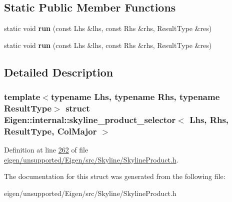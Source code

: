 \subsection*{Static Public Member Functions}
\begin{DoxyCompactItemize}
\item 
\mbox{\label{struct_eigen_1_1internal_1_1skyline__product__selector_3_01_lhs_00_01_rhs_00_01_result_type_00_01_col_major_01_4_ac8fd5125ad298b7543e881a0a0f2a40c}} 
static void {\bfseries run} (const Lhs \&lhs, const Rhs \&rhs, Result\+Type \&res)
\item 
\mbox{\label{struct_eigen_1_1internal_1_1skyline__product__selector_3_01_lhs_00_01_rhs_00_01_result_type_00_01_col_major_01_4_ac8fd5125ad298b7543e881a0a0f2a40c}} 
static void {\bfseries run} (const Lhs \&lhs, const Rhs \&rhs, Result\+Type \&res)
\end{DoxyCompactItemize}


\subsection{Detailed Description}
\subsubsection*{template$<$typename Lhs, typename Rhs, typename Result\+Type$>$\newline
struct Eigen\+::internal\+::skyline\+\_\+product\+\_\+selector$<$ Lhs, Rhs, Result\+Type, Col\+Major $>$}



Definition at line \hyperlink{eigen_2unsupported_2_eigen_2src_2_skyline_2_skyline_product_8h_source_l00262}{262} of file \hyperlink{eigen_2unsupported_2_eigen_2src_2_skyline_2_skyline_product_8h_source}{eigen/unsupported/\+Eigen/src/\+Skyline/\+Skyline\+Product.\+h}.



The documentation for this struct was generated from the following file\+:\begin{DoxyCompactItemize}
\item 
eigen/unsupported/\+Eigen/src/\+Skyline/\+Skyline\+Product.\+h\end{DoxyCompactItemize}
